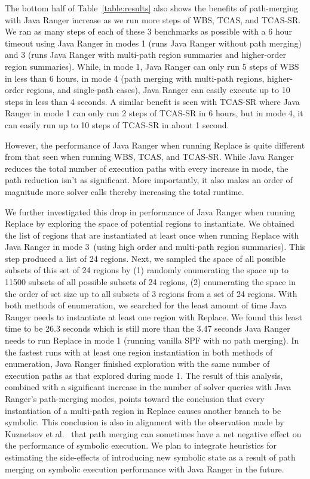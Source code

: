 %
The bottom half of Table~\ref{table:results} also shows the benefits of path-merging with Java Ranger increase as we run
more steps of WBS, TCAS, and TCAS-SR.
%
We ran as many steps of each of these 3 benchmarks as possible with a 6 hour timeout using Java Ranger in modes
1 (runs Java Ranger without path merging) and 3 (runs Java Ranger with multi-path region summaries and higher-order region summaries).
%
While, in mode 1, Java Ranger can only run 5 steps of WBS in less than 6 hours, in mode 4 (path merging with multi-path regions, higher-order regions, and single-path cases),
Java Ranger can easily execute up to 10 steps in less than 4 seconds.
%
A similar benefit is seen with TCAS-SR where Java Ranger in mode 1 can only run 2 steps of TCAS-SR in 6 hours, but in
mode 4, it can easily run up to 10 steps of TCAS-SR in about 1 second.

However, the performance of Java Ranger when running Replace is quite different from that seen when running WBS, TCAS, and TCAS-SR.
%
While Java Ranger reduces the total number of execution paths with every increase in mode, the path reduction isn't as significant.
%
More importantly, it also makes an order of magnitude more solver calls thereby increasing the total runtime.

We further investigated this drop in performance of Java Ranger when running Replace by exploring the space of potential
regions to instantiate.
%
We obtained the list of regions that are instantiated at least once when running Replace with Java Ranger in mode 3~(using
high order and multi-path region summaries).
%
This step produced a list of 24 regions.
%
Next, we sampled the space of all possible subsets of this set of 24 regions by
%
(1) randomly enumerating the space up to 11500 subsets of all possible subsets of 24 regions,
%
(2) enumerating the space in the order of set size up to all subsets of 3 regions from a set of 24 regions.
%
With both methods of enumeration, we searched for the least amount of time Java Ranger needs to instantiate at least one
region with Replace.
%
We found this least time to be 26.3 seconds which is still more than the 3.47 seconds Java Ranger needs to run
Replace in mode 1 (running vanilla SPF with no path merging).
%
In the fastest runs with at least one region instantiation in both methods of enumeration, Java Ranger finished
exploration with the same number of execution paths as that explored during mode 1.
%
The result of this analysis, combined with a significant increase in the number of solver queries with Java Ranger's
path-merging modes, points toward the conclusion that every instantiation of a multi-path region in Replace causes another branch to be
symbolic.
%
This conclusion is also in alignment with the observation made by Kuznetsov et al.~\cite{kuznetsov} that path merging can
sometimes have a net negative effect on the performance of symbolic execution.
%
We plan to integrate heuristics for estimating the side-effects of introducing new symbolic state as a result of
path merging on symbolic execution performance with Java Ranger in the future.
